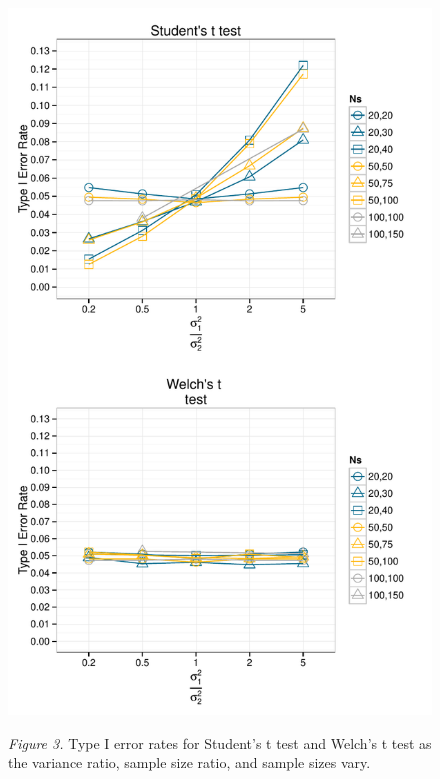\documentclass[man,a4paper,noextraspace,apacite]{apa6}
\begin{document}
\begin{figure}    
\includegraphics{WelchManuscript-MASTER-Type1ClassicPlot}

\textit{Figure 3.} Type I error rates for Student's t test and Welch's t test 
as the variance ratio, sample size ratio, and sample sizes vary.
\end{figure}


\end{document}
